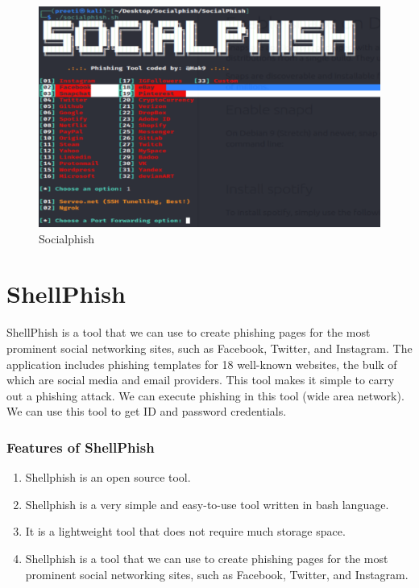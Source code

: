 \documentclass[openany]{report}
\begin{document}
\begin{figure}[H]
    \centering
    \includegraphics[width=.95\textwidth]{socialphish.png}
    \caption{Socialphish}
    \label{fig:socialphish}
\end{figure}

\section{ShellPhish}
ShellPhish is a tool that we can use to create phishing pages for the most prominent social networking sites, such as Facebook, Twitter, and Instagram. The application includes phishing templates for 18 well-known websites, the bulk of which are social media and email providers. This tool makes it simple to carry out a phishing attack. We can execute phishing in this tool (wide area network). We can use this tool to get ID and password credentials.

\subsubsection{Features of ShellPhish}

\begin{enumerate}
    \item Shellphish is an open source tool.
    \item Shellphish is a very simple and easy-to-use tool written in bash language.
    \item It is a lightweight tool that does not require much storage space.
    \item Shellphish is a tool that we can use to create phishing pages for the most prominent social networking sites, such as Facebook, Twitter, and Instagram.
\end{enumerate}
\end{document}
